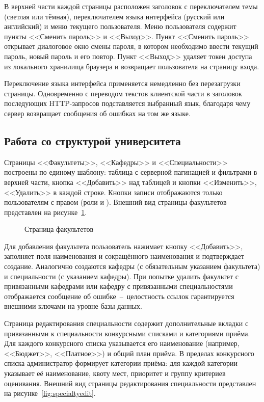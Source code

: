 В верхней части каждой страницы расположен заголовок с переключателем темы (светлая или тёмная), переключателем языка интерфейса (русский или английский) и меню текущего пользователя.
Меню пользователя содержит пункты <<Сменить пароль>> и <<Выход>>.
Пункт <<Сменить пароль>> открывает диалоговое окно смены пароля, в котором необходимо ввести текущий пароль, новый пароль и его повтор.
Пункт <<Выход>> удаляет токен доступа из локального хранилища браузера и возвращает пользователя на страницу входа.

Переключение языка интерфейса применяется немедленно без перезагрузки страницы.
Одновременно с переводом текстов клиентской части в заголовок  последующих HTTP-запросов подставляется выбранный язык, благодаря чему сервер возвращает сообщения об ошибках на том же языке.

\subsection{Работа со структурой университета}

Страницы <<Факультеты>>, <<Кафедры>> и <<Специальности>> построены по единому шаблону: таблица с серверной пагинацией и фильтрами в верхней части, кнопка <<Добавить>> над таблицей и кнопки <<Изменить>>, <<Удалить>> в каждой строке.
Кнопки записи отображаются только пользователям с правом  (роли  и ).
Внешний вид страницы факультетов представлен на рисунке~\ref{fig:faculties}.

\begin{figure}[htbp]
\centering
{}
\caption{Страница факультетов}
\label{fig:faculties}
\end{figure}

Для добавления факультета пользователь нажимает кнопку <<Добавить>>, заполняет поля наименования и сокращённого наименования и подтверждает создание.
Аналогично создаются кафедры (с обязательным указанием факультета) и специальности (с указанием кафедры).
При попытке удалить факультет с привязанными кафедрами или кафедру с привязанными специальностями отображается сообщение об ошибке~--~целостность ссылок гарантируется внешними ключами на уровне базы данных.

Страница редактирования специальности содержит дополнительные вкладки с привязанными к специальности конкурсными списками и категориями приёма.
Для каждого конкурсного списка указывается его наименование (например, <<Бюджет>>, <<Платное>>) и общий план приёма.
В пределах конкурсного списка администратор формирует категории приёма: для каждой категории указывает её наименование, квоту мест, приоритет и группу критериев оценивания.
Внешний вид страницы редактирования специальности представлен на рисунке~\ref{fig:specialtyedit}.

